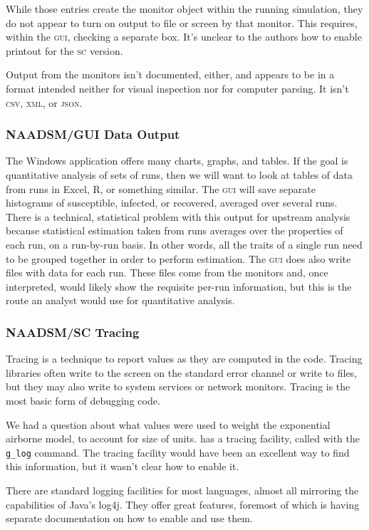 \documentclass{article}
\begin{document}
While those entries create the monitor object within
the running simulation, they do not appear to turn on
output to file or screen by that monitor. This requires,
within the \textsc{gui}, checking a separate box.
It's unclear to the authors how to enable printout for
the \textsc{sc} version.

Output from the monitors isn't documented, either,
and appears to be in a format intended neither for visual
inspection nor for computer parsing. It isn't \textsc{csv},
\textsc{xml}, or \textsc{json}.


\subsubsection{NAADSM/GUI Data Output}
The \naadsm Windows application offers many charts, graphs,
and tables.
If the goal is quantitative analysis of sets of runs,
then we will want to look at tables of data from runs in Excel,
R, or something similar.
The \textsc{gui} will save separate histograms of susceptible,
infected, or recovered, averaged over several runs.
There is a technical, statistical problem with this output
for upstream analysis because statistical estimation
taken from runs averages over the properties of each run,
on a run-by-run basis. In other words, all the traits of
a single run need to be grouped together in order to
perform estimation.
The \textsc{gui} does also write files with data for
each run. These files come from the monitors and, once
interpreted, would likely show the requisite per-run information,
but this is the route an analyst would use for quantitative
analysis.


\subsubsection{NAADSM/SC Tracing}
Tracing is a technique to report values as they are
computed in the code. Tracing libraries often write to
the screen on the standard error channel or write to
files, but they may also write to system services or
network monitors. Tracing is the most basic form of
debugging code.

We had a question about what values were used to weight
the exponential airborne model, to account for 
size of units.
\naadsm has a tracing facility, called with the
\texttt{g\_log} command. The tracing facility would
have been an excellent way to find this information,
but it wasn't clear how to enable it.

There are standard logging facilities for most languages,
almost all mirroring the capabilities of Java's log4j.
They offer great features, foremost of which is having
separate documentation on how to enable and use them.
\end{document}
